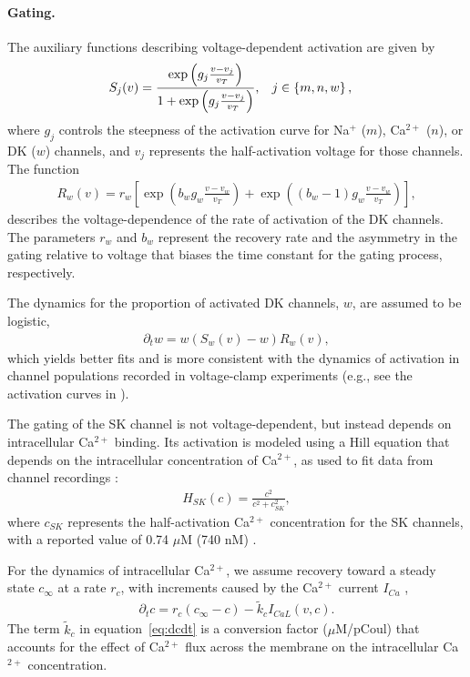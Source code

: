 \documentclass[10pt,letterpaper]{article}
\newcommand{\Ca}{Ca$^{2+}$}
\newcommand{\Na}{Na$^{+}$}
\newcommand{\lrSquare}[1]{\left[#1\right]}
\newcommand{\lrSet}[1]{\left\{#1\right\}}
\begin{document}
\paragraph{Gating.} 
The auxiliary functions describing voltage-dependent activation are given by
\begin{align}
S_j(v) &= \frac{\textrm{exp}\left(g_j \frac{v-v_j}{v_T} \right)}{1 + \textrm{exp}\left(g_j \frac{v-v_j}{v_T} \right)}, \hspace{0.3cm} j \in \lrSet{m,n,w}, 
\label{eq:gating}
\end{align}
where $g_j$ controls the steepness of the activation curve for {\Na} ($m$), {\Ca} ($n$), or DK ($w$) channels, and $v_j$ represents the half-activation voltage for those channels. 
The function
\begin{eqnarray}
\label{eq:actRate}
    R_w(v) = r_w \lrSquare{ \exp \left(b_w g_w\frac{v-v_w}{v_T}\right) + \exp \left((b_w-1)g_w\frac{v-v_w}{v_T}\right)},
\end{eqnarray}  
describes the voltage-dependence of the rate of activation of the DK channels. The parameters  $r_w$ and $b_w$ represent the recovery rate  and  the asymmetry in the gating relative to voltage that biases the time constant for the gating process, respectively. 

The dynamics for the proportion of activated DK channels, $w$,  are assumed to be logistic,
\begin{eqnarray}
\label{eq:dwdt}
\partial_t{w} = w (S_w(v)-w)  R_w(v), 
\end{eqnarray}
which yields better fits and is more consistent with the dynamics of activation in channel populations recorded in voltage-clamp experiments (e.g., see the activation curves in  \cite{Covarrubiasetal1991,hodgkin1952quantitative,TsunodaSalkoff1995b}).

The gating of the SK channel is not voltage-dependent, but instead depends on intracellular {\Ca} binding. Its activation is modeled using a Hill equation that depends on the intracellular concentration of {\Ca}, as used to fit data from channel recordings \cite{hirschberg1998gating}:
\begin{eqnarray}
H_{SK}(c) = \frac{c^2}{c^2 + c_{SK}^2},
\end{eqnarray}
where $c_{SK}$ represents the half-activation {\Ca} concentration for the SK channels, with a reported value of 0.74 $\mu$M (740 nM) \cite{hirschberg1998gating,stocker20042+}.

For the dynamics of intracellular {\Ca}, we assume recovery toward a steady state $c_{\infty}$ at a rate $r_c$, with increments caused by the {\Ca} current $I_{Ca}$ \cite{avron1991minimal},
\begin{eqnarray}
\partial_t{c} = r_{c}({c_{\infty} - c}) - \tilde{k}_{c} I_{CaL}(v,c).
\label{eq:dcdt}
\end{eqnarray}
The term $\tilde{k}_c$ in equation~\eqref{eq:dcdt} is a conversion factor ($\mu$M/pCoul) that accounts for the effect of {\Ca} flux across the membrane on the intracellular {\Ca} concentration. 
\end{document}
